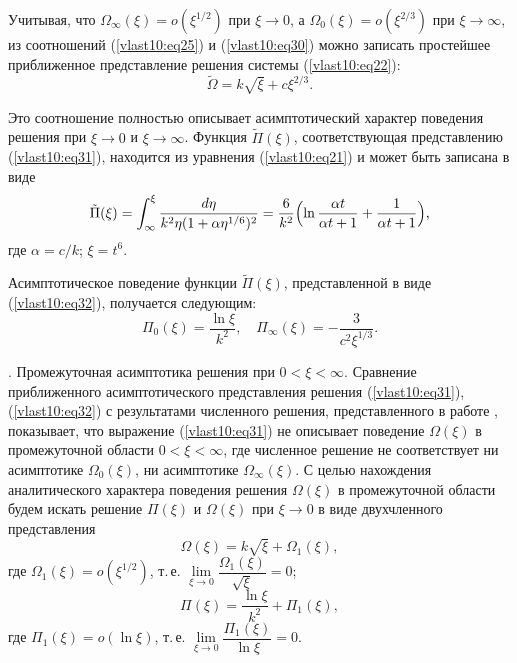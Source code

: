 Учитывая, что $\Omega_\infty(\xi)=o(\xi^{1/2})$ при $\xi \to 0$,
а $\Omega_0(\xi)=o(\xi^{2/3})$ при \mbox{$\xi\to\infty$,}
из соотношений (\ref{vlast10:eq25}) и (\ref{vlast10:eq30}) можно записать простейшее приближенное представление решения системы
(\ref{vlast10:eq22}):
\begin{equation}
\tilde \Omega  = k \sqrt \xi   +  c \xi^{2/3}.\label{vlast10:eq31}
\end{equation}

Это соотношение полностью описывает асимптотический характер
поведения решения при $\xi  \to 0$ и
$\xi  \to \infty $. Функция
$\tilde \Pi (\xi )$, соответствующая
представлению (\ref{vlast10:eq31}), находится из уравнения (\ref{vlast10:eq21}) и может быть записана в виде
\begin{equation}
\tilde \Pi (\xi ) = \int _\infty ^\xi
\frac{d\eta }{k^2\eta (1 + \alpha \eta^{1/6})^2}  =
\frac{6}{k^2} \Bigl(\ln \frac{\alpha t}{\alpha t + 1} + \frac{1}{\alpha t + 1}\Bigr),\label{vlast10:eq32}
\end{equation}
где  $\alpha  = c/k$; $\xi  = t^6$.

Асимптотическое поведение функции $\tilde \Pi (\xi)$, представленной в виде (\ref{vlast10:eq32}), получается следующим:
$$
\Pi _0(\xi ) = \frac{\ln \xi }{k^2}, \quad \Pi_\infty (\xi ) =  - \frac{3}{c^2 \xi^{1/3}}.
$$

{\small {}. Промежуточная асимптотика решения при $0 < \xi  < \infty $.}
Сравнение приближенного асимптотического представления решения (\ref{vlast10:eq31}), (\ref{vlast10:eq32})
с результатами численного решения, представленного в работе
\cite{vlast10:8}, показывает, что выражение (\ref{vlast10:eq31})
не описывает поведение $\Omega ( \xi )$ в промежуточной области $0 < \xi  <
\infty $, где численное решение не соответствует ни
асимптотике $\Omega _0 ( \xi )$, ни асимптотике $\Omega _\infty
( \xi )$. С целью нахождения аналитического
характера поведения решения $\Omega ( \xi )$ в промежуточной области будем искать решение
$\Pi ( \xi )$ и $\Omega ( \xi )$ при
$\xi  \to 0$ в виде двухчленного
представления
\begin{equation}
\Omega ( \xi ) = k \sqrt \xi   + \Omega_1 ( \xi ),\label{vlast10:eq33}
\end{equation}
где  $\Omega_1 (\xi) = o( \xi^{1/2})$, т.\,е. $\lim \limits_{\xi  \to 0} \dfrac{\Omega _1 ( \xi )}{\sqrt
\xi}= 0$;
\begin{equation}
\Pi ( \xi ) = \frac{\ln \xi}{k^2} + \Pi_1 ( \xi ),\label{vlast10:eq34}
\end{equation}
где  $\Pi _1 ( \xi ) = o (\ln \xi )$, т.\,е. $\lim \limits_{\xi
\to 0} \dfrac{\Pi _1 ( \xi )}{\ln \xi } = 0$.

